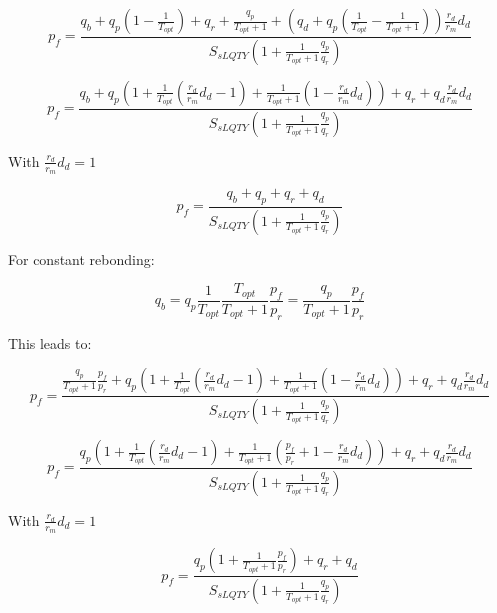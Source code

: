 \documentclass{article}
\begin{document}
\[
p_{f} = \frac{q_{b}+q_{p}\left(1-\frac{1}{T_{opt}}\right)+q_{r}+ \frac{q_{p}}{T_{opt}+1}+\left(q_{d}+q_{p} \left( \frac{1}{T_{opt}}- \frac{1}{T_{opt}+1} \right)\right)\frac{r_{d}}{r_{m}}d_{d}}{S_{sLQTY}\left(1+  \frac{1}{T_{opt}+1}\frac{q_{p}}{q_{r}}\right)}
\]

\begin{equation}
  \label{eq:recursive_optimal_1}
p_{f} = \frac{q_{b}+q_{p} \left(1+\frac{1}{T_{opt}}\left(\frac{r_{d}}{r_{m}}d_{d}-1\right)+ \frac{1}{T_{opt}+1}\left( 1 - \frac{r_{d}}{r_{m}}d_{d} \right)\right)+q_{r}+q_{d}\frac{r_{d}}{r_{m}}d_{d}}{S_{sLQTY}\left(1+  \frac{1}{T_{opt}+1}\frac{q_{p}}{q_{r}}\right)}
\end{equation}

With $\frac{r_{d}}{r_{m}}d_{d}=1$

\begin{equation}
  \label{eq:recursive_optimal_2}
p_{f} = \frac{q_{b}+q_{p}+q_{r}+q_{d}}{S_{sLQTY}\left(1+  \frac{1}{T_{opt}+1}\frac{q_{p}}{q_{r}}\right)}
\end{equation}

For constant rebonding:

\begin{equation}
q_{b} = q_{p} \frac{1}{T_{opt}} \frac{T_{opt}}{T_{opt}+1}\frac{p_{f}}{p_{r}} = \frac{q_{p}}{T_{opt}+1}\frac{p_{f}}{p_{r}}
\end{equation}

This leads to:

\[
p_{f} = \frac{ \frac{q_{p}}{T_{opt}+1}\frac{p_{f}}{p_{r}}+q_{p} \left(1+\frac{1}{T_{opt}}\left(\frac{r_{d}}{r_{m}}d_{d}-1\right)+ \frac{1}{T_{opt}+1}\left( 1 - \frac{r_{d}}{r_{m}}d_{d} \right)\right)+q_{r}+q_{d}\frac{r_{d}}{r_{m}}d_{d}}{S_{sLQTY}\left(1+  \frac{1}{T_{opt}+1}\frac{q_{p}}{q_{r}}\right)}
\]

\begin{equation}
p_{f} = \frac{q_{p} \left(1 + \frac{1}{T_{opt}}\left(\frac{r_{d}}{r_{m}}d_{d}-1\right)+ \frac{1}{T_{opt}+1}\left(\frac{p_{f}}{p_{r}} + 1 - \frac{r_{d}}{r_{m}}d_{d} \right)\right)+q_{r}+q_{d}\frac{r_{d}}{r_{m}}d_{d}}{S_{sLQTY}\left(1+  \frac{1}{T_{opt}+1}\frac{q_{p}}{q_{r}}\right)}
\end{equation}

With $\frac{r_{d}}{r_{m}}d_{d}=1$

\begin{equation}
p_{f} = \frac{q_{p} \left( 1+   \frac{1}{T_{opt}+1}\frac{p_{f}}{p_{r}} \right)+q_{r}+q_{d}}{S_{sLQTY}\left(1+  \frac{1}{T_{opt}+1}\frac{q_{p}}{q_{r}}\right)}
\end{equation}
\end{document}
